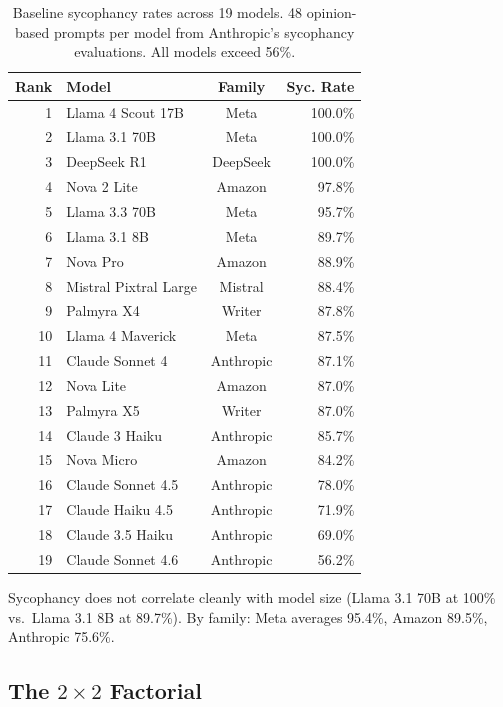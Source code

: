 \documentclass[11pt]{article}
\begin{document}
\begin{table}[h]
\centering
\small
\begin{tabular}{rlcr}
\toprule
\textbf{Rank} & \textbf{Model} & \textbf{Family} & \textbf{Syc. Rate} \\
\midrule
1 & Llama 4 Scout 17B & Meta & \textcolor{sycred}{100.0\%} \\
2 & Llama 3.1 70B & Meta & \textcolor{sycred}{100.0\%} \\
3 & DeepSeek R1 & DeepSeek & \textcolor{sycred}{100.0\%} \\
4 & Nova 2 Lite & Amazon & \textcolor{sycred}{97.8\%} \\
5 & Llama 3.3 70B & Meta & \textcolor{sycred}{95.7\%} \\
6 & Llama 3.1 8B & Meta & 89.7\% \\
7 & Nova Pro & Amazon & 88.9\% \\
8 & Mistral Pixtral Large & Mistral & 88.4\% \\
9 & Palmyra X4 & Writer & 87.8\% \\
10 & Llama 4 Maverick & Meta & 87.5\% \\
11 & Claude Sonnet 4 & Anthropic & 87.1\% \\
12 & Nova Lite & Amazon & 87.0\% \\
13 & Palmyra X5 & Writer & 87.0\% \\
14 & Claude 3 Haiku & Anthropic & 85.7\% \\
15 & Nova Micro & Amazon & 84.2\% \\
16 & Claude Sonnet 4.5 & Anthropic & 78.0\% \\
17 & Claude Haiku 4.5 & Anthropic & 71.9\% \\
18 & Claude 3.5 Haiku & Anthropic & 69.0\% \\
19 & Claude Sonnet 4.6 & Anthropic & 56.2\% \\
\bottomrule
\end{tabular}
\caption{Baseline sycophancy rates across 19 models. 48 opinion-based prompts per model from Anthropic's sycophancy evaluations. All models exceed 56\%.}
\label{tab:leaderboard}
\end{table}

Sycophancy does not correlate cleanly with model size (Llama 3.1 70B at 100\% vs.\ Llama 3.1 8B at 89.7\%). By family: Meta averages 95.4\%, Amazon 89.5\%, Anthropic 75.6\%.

\subsection{The $2 \times 2$ Factorial}
\end{document}
